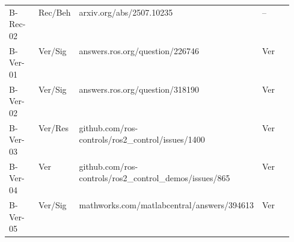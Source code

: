 \begin{longtable}{@{}ll>{\raggedright\arraybackslash}p{0.44\linewidth}>{\raggedright\arraybackslash}p{0.11\linewidth}@{}}
B-Rec-02 & Rec/Beh & {\scriptsize\ttfamily arxiv.org/\allowbreak{}abs/\allowbreak{}2507.10235} & -- \\
B-Ver-01 & Ver/Sig & {\scriptsize\ttfamily answers.ros.org/\allowbreak{}question/\allowbreak{}226746} & Ver \\
B-Ver-02 & Ver/Sig & {\scriptsize\ttfamily answers.ros.org/\allowbreak{}question/\allowbreak{}318190} & Ver \\
B-Ver-03 & Ver/Res & {\scriptsize\ttfamily github.com/\allowbreak{}ros-controls/\allowbreak{}ros2\_control/\allowbreak{}issues/\allowbreak{}1400} & Ver \\
B-Ver-04 & Ver & {\scriptsize\ttfamily github.com/\allowbreak{}ros-controls/\allowbreak{}ros2\_control\_demos/\allowbreak{}issues/\allowbreak{}865} & Ver \\
B-Ver-05 & Ver/Sig & {\scriptsize\ttfamily mathworks.com/\allowbreak{}matlabcentral/\allowbreak{}answers/\allowbreak{}394613} & Ver \\
\end{longtable}